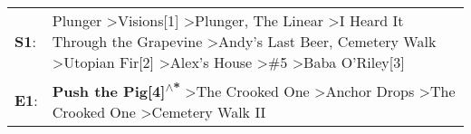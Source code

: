 \begin{supertabular}{p{0.03\textwidth}p{0.92\textwidth}}
 \textbf{S1}:  &  Plunger\textsuperscript{} \textgreater \enspace Visions[1]\textsuperscript{} \textgreater \enspace Plunger\textsuperscript{}, \enspace The Linear\textsuperscript{} \textgreater \enspace I Heard It Through the Grapevine\textsuperscript{} \textgreater \enspace Andy's Last Beer\textsuperscript{}, \enspace Cemetery Walk\textsuperscript{} \textgreater \enspace Utopian Fir[2]\textsuperscript{} \textgreater \enspace Alex's House\textsuperscript{} \textgreater \enspace \#5\textsuperscript{} \textgreater \enspace Baba O'Riley[3]\textsuperscript{}  \enspace  \\
 \textbf{E1}:  &                                                                                                                                                                                                                                                                                \textbf{Push the Pig[4]\textsuperscript{$\wedge$*}} \textgreater \enspace The Crooked One\textsuperscript{} \textgreater \enspace Anchor Drops\textsuperscript{} \textgreater \enspace The Crooked One\textsuperscript{} \textgreater \enspace Cemetery Walk II\textsuperscript{}  \enspace  \\
\end{supertabular}

